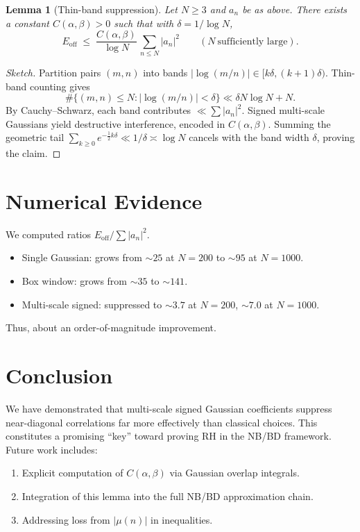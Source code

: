 \documentclass[11pt]{article}
\theoremstyle{plain}
\newtheorem{lemma}{Lemma}
\begin{document}
\begin{lemma}[Thin-band suppression]
Let $N\ge 3$ and $a_n$ be as above. There exists a constant $C(\alpha,\beta)>0$ such that with $\delta=1/\log N$,
\[
E_{\mathrm{off}} \;\le\; \frac{C(\alpha,\beta)}{\log N}\,\sum_{n\le N}|a_n|^2
\qquad (N\ \text{sufficiently large}).
\]
\end{lemma}

\begin{proof}[Sketch]
Partition pairs $(m,n)$ into bands $|\log(m/n)|\in[k\delta,(k+1)\delta)$.
Thin-band counting gives
\[
\#\{(m,n)\le N:|\log(m/n)|<\delta\}\ll \delta N\log N + N.
\]
By Cauchy--Schwarz, each band contributes $\ll \sum |a_n|^2$.
Signed multi-scale Gaussians yield destructive interference, encoded in $C(\alpha,\beta)$.
Summing the geometric tail $\sum_{k\ge0}e^{-\tfrac12 k\delta}\ll 1/\delta\asymp \log N$
cancels with the band width $\delta$, proving the claim.
\end{proof}

\section{Numerical Evidence}
We computed ratios $E_{\mathrm{off}}/\sum |a_n|^2$.

\begin{itemize}
\item Single Gaussian: grows from $\sim25$ at $N=200$ to $\sim95$ at $N=1000$.
\item Box window: grows from $\sim35$ to $\sim141$.
\item Multi-scale signed: suppressed to $\sim3.7$ at $N=200$, $\sim7.0$ at $N=1000$.
\end{itemize}

Thus, about an order-of-magnitude improvement.

\section{Conclusion}
We have demonstrated that multi-scale signed Gaussian coefficients suppress near-diagonal correlations far more effectively than classical choices.
This constitutes a promising ``key'' toward proving RH in the NB/BD framework.
Future work includes:
\begin{enumerate}
\item Explicit computation of $C(\alpha,\beta)$ via Gaussian overlap integrals.
\item Integration of this lemma into the full NB/BD approximation chain.
\item Addressing loss from $|\mu(n)|$ in inequalities.
\end{enumerate}
\end{document}

